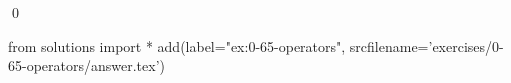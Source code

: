 
\begin{ex}
  \label{ex:0-65-operators}
  
  \qed
\end{ex}
\begin{python0}
from solutions import *
add(label="ex:0-65-operators",
    srcfilename='exercises/0-65-operators/answer.tex')
\end{python0}
